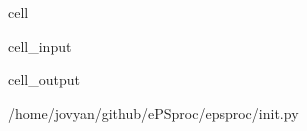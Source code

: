 \documentclass[letterpaper,table,10pt,english]{jupyterBook}
\begin{document}
\begin{sphinxuseclass}{cell}\begin{sphinxVerbatimInput}

\begin{sphinxuseclass}{cell_input}
\begin{sphinxVerbatim}[commandchars=\\\{\}]
   
   
\end{sphinxVerbatim}

\end{sphinxuseclass}\end{sphinxVerbatimInput}
\begin{sphinxVerbatimOutput}

\begin{sphinxuseclass}{cell_output}
\begin{sphinxVerbatim}[commandchars=\\\{\}]
\PYGZsq{}/home/jovyan/github/ePSproc/epsproc/\PYGZus{}\PYGZus{}init\PYGZus{}\PYGZus{}.py\PYGZsq{}
\end{sphinxVerbatim}

\end{sphinxuseclass}\end{sphinxVerbatimOutput}

\end{sphinxuseclass}
\end{document}
